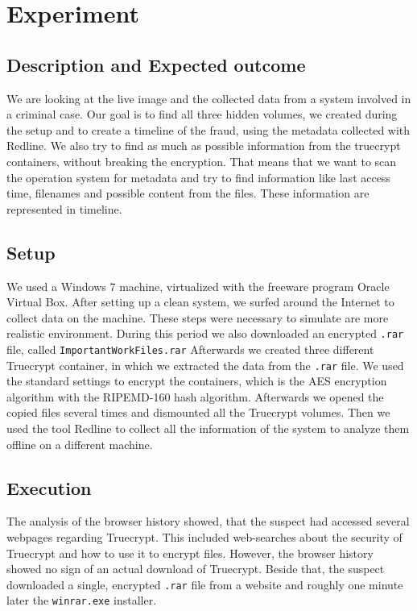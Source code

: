 \section{Experiment}
\subsection{Description and Expected outcome}
We are looking at the live image and the collected data from a system involved in a criminal case. Our goal is to find all three hidden volumes, we created during the setup and to create a timeline of the fraud, using the metadata collected with Redline. 
We also try to find as much as possible information from the truecrypt containers, without breaking the encryption. That means that we want to scan the operation system for metadata and try to find information like last access time, filenames and possible content from the files. These information are represented in timeline.

\subsection{Setup}
We used a Windows 7 machine, virtualized with the freeware program Oracle Virtual Box. After setting up a clean system, we surfed around the Internet to collect data on the machine. 
These steps were necessary to simulate are more realistic environment.
During this period we also downloaded an encrypted \verb+.rar+ file, called \verb+ImportantWorkFiles.rar+ Afterwards we created three different Truecrypt container, in which we extracted the data from the \verb+.rar+ file.
We used the standard settings to encrypt the containers, which is the AES encryption algorithm with the RIPEMD-160 hash algorithm.
Afterwards we opened the copied files several times and dismounted all the Truecrypt volumes.
Then we used the tool Redline to collect all the information of the system to analyze them offline on a different machine.

\subsection{Execution}
The analysis of the browser history showed, that the suspect had accessed several webpages regarding Truecrypt. This included web-searches about the security of Truecrypt and how to use it to encrypt files. However, the browser history showed no sign of an actual download of Truecrypt. Beside that, the suspect downloaded a single, encrypted \verb+.rar+ file from a website and roughly one minute later the \verb+winrar.exe+ installer.

